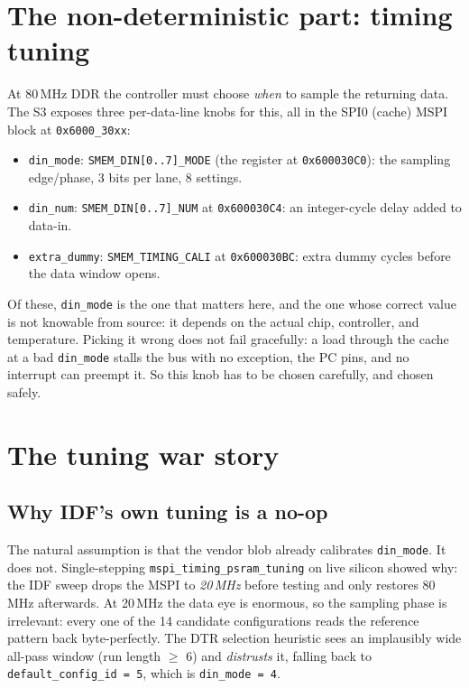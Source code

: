 \section{The non-deterministic part: timing tuning}

At 80\,MHz DDR the controller must choose \emph{when} to sample the returning data.
The S3 exposes three per-data-line knobs for this, all in the SPI0 (cache) MSPI block
at \texttt{0x6000\_30xx}:

\begin{itemize}
\item \texttt{din\_mode}: \texttt{SMEM\_DIN[0..7]\_MODE} (the register at
\texttt{0x600030C0}): the sampling edge/phase, 3 bits per lane, 8 settings.
\item \texttt{din\_num}: \texttt{SMEM\_DIN[0..7]\_NUM} at \texttt{0x600030C4}: an
integer-cycle delay added to data-in.
\item \texttt{extra\_dummy}: \texttt{SMEM\_TIMING\_CALI} at \texttt{0x600030BC}:
extra dummy cycles before the data window opens.
\end{itemize}

Of these, \texttt{din\_mode} is the one that matters here, and the one whose correct
value is not knowable from source: it depends on the actual chip, controller, and
temperature. Picking it wrong does not fail gracefully: a load through the cache at a
bad \texttt{din\_mode} stalls the bus with no exception, the PC pins, and no interrupt
can preempt it. So this knob has to be chosen carefully, and chosen safely.

\section{The tuning war story}

\subsection{Why IDF's own tuning is a no-op}

The natural assumption is that the vendor blob already calibrates \texttt{din\_mode}.
It does not. Single-stepping \texttt{mspi\_timing\_psram\_tuning} on live silicon
showed why: the IDF sweep drops the MSPI to \emph{20\,MHz} before testing and only
restores 80\,MHz afterwards. At 20\,MHz the data eye is enormous, so the sampling
phase is irrelevant: every one of the 14 candidate configurations reads the
reference pattern back byte-perfectly. The DTR selection heuristic sees an
implausibly wide all-pass window (run length $\ge$ 6) and \emph{distrusts} it, falling
back to \texttt{default\_config\_id = 5}, which is \texttt{din\_mode = 4}.

